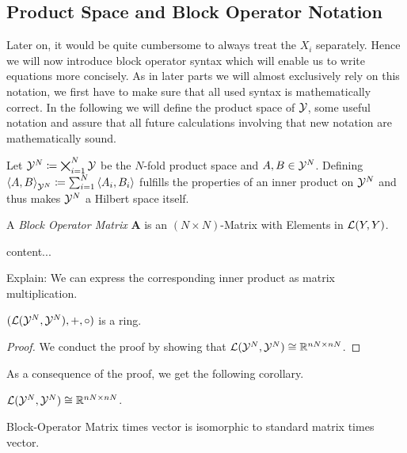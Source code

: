 \subsection{Product Space and Block Operator Notation}
Later on, it would be quite cumbersome to always treat the $X_i$ separately.
Hence we will now introduce block operator syntax which will enable us to write equations more concisely.
As in later parts we will almost exclusively rely on this notation, we first have to make sure that all used syntax is mathematically correct.
In the following we will define the product space of $\mathcal{Y}$, some useful notation and assure that all future calculations involving that new notation are mathematically sound.

Let $\mathcal{Y}^N \coloneqq \bigtimes_{i=1}^N \mathcal{Y}$ be the $N$-fold product space and $A, B \in \mathcal{Y}^N$.
Defining $\left < A, B \right >_{\mathcal{Y}^N} \coloneqq \sum_{i=1}^{N} \left <A_i, B_i \right >$ fulfills the properties of an inner product on $\cY^N$ and thus makes $\cY^N$ a Hilbert space itself.


\begin{definition}
	A \emph{Block Operator Matrix} $\mathbf{A}$ is an $(N \times N)$-Matrix with Elements in $\mathcal{L}(Y, Y)$.
\end{definition}

\begin{definition}[$\cY^N$]
	content... 
\end{definition}
Explain: We can express the corresponding inner product as matrix multiplication.

\begin{theorem}
	$(\mathcal{L}(\mathcal{Y}^N, \mathcal{Y}^N), +, \circ)$ is a  ring.
\end{theorem}
\begin{proof}
	We conduct the proof by showing that $\mathcal{L}(\mathcal{Y}^N, \mathcal{Y}^N) \cong \mathbb{R}^{nN \times nN}$.
\end{proof}

As a consequence of the proof, we get the following corollary.
\begin{corollary}
	\label{cor:matrix-ring-equivalence}
	$\mathcal{L}(\mathcal{Y}^N, \mathcal{Y}^N) \cong \mathbb{R}^{nN \times nN}$.
\end{corollary}

\begin{corollary}
	\label{cor:matrix-vector-equivalence}
	Block-Operator Matrix times vector is isomorphic to standard matrix times vector.
\end{corollary}



